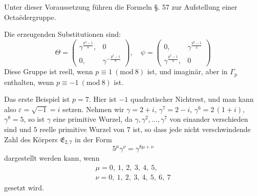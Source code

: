 Unter dieser Voraussetzung führen die Formeln §. 57 zur
Aufstellung einer Octaëdergruppe.

Die erzeugenden Substitutionen sind:
\[
\Theta = \begin{pmatrix} \gamma^{\frac{p^2-1}{8}}, & 0 \\ 0, & \gamma^{-\frac{p^2-1}{8}} \end{pmatrix}, \quad
\psi = \begin{pmatrix} 0, & \gamma^{\frac{p^2-1}{4}} \\ \gamma^{\frac{p^2-1}{4}}, & 0 \end{pmatrix}
\]
Diese Gruppe ist reell, wenn $p\equiv 1\ (\mathrm{mod}\ 8)$ ist, und imaginär, aber in $\Gamma_p$ enthalten, wenn $p\equiv -1\ (\mathrm{mod}\ 8)$ ist.

Das erste Beispiel ist $p=7$. Hier ist $-1$ quadratischer Nichtrest, und man kann also $\varepsilon=\sqrt{-1}=i$ setzen. Nehmen wir $\gamma=2+i$, $\gamma^7=2-i$, $\gamma^6=2\,(1+i)$, $\gamma^8=5$, so ist $\gamma$ eine primitive Wurzel, da $\gamma,\gamma^2,\dots,\gamma^7$ von einander verschieden sind und $5$ reelle primitive Wurzel von $7$ ist, so dass jede nicht verschwindende Zahl des Körpers $\mathfrak{E}_{2,7}$ in der Form
\[
5^{\mu}\gamma^{\nu} = \gamma^{8\mu+\nu}
\]
dargestellt werden kann, wenn
\[
\begin{gathered}
\mu = 0,\ 1,\ 2,\ 3,\ 4,\ 5,\\
\nu = 0,\ 1,\ 2,\ 3,\ 4,\ 5,\ 6,\ 7
\end{gathered}
\]
gesetzt wird.


